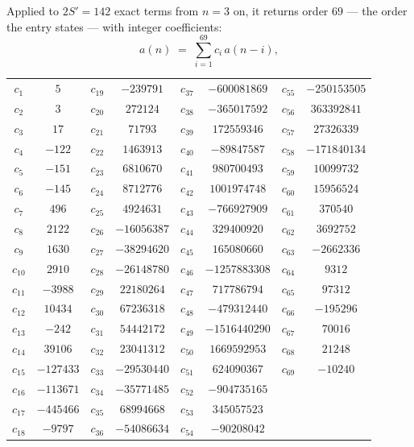 \documentclass[11pt,a4paper]{article}
\theoremstyle{plain}
\theoremstyle{definition}
\begin{document}
Applied to $2S'=142$ exact terms from $n=3$ on, it returns order $69$ --- the
order the entry states --- with integer coefficients:
\[
a(n)\;=\;\sum_{i=1}^{69}c_i\,a(n-i),
\]
\begin{center}\small
\begin{tabular}{cccccccc}
$c_{1}$ & $5$ & $c_{19}$ & $-239791$ & $c_{37}$ & $-600081869$ & $c_{55}$ & $-250153505$ \\
$c_{2}$ & $3$ & $c_{20}$ & $272124$ & $c_{38}$ & $-365017592$ & $c_{56}$ & $363392841$ \\
$c_{3}$ & $17$ & $c_{21}$ & $71793$ & $c_{39}$ & $172559346$ & $c_{57}$ & $27326339$ \\
$c_{4}$ & $-122$ & $c_{22}$ & $1463913$ & $c_{40}$ & $-89847587$ & $c_{58}$ & $-171840134$ \\
$c_{5}$ & $-151$ & $c_{23}$ & $6810670$ & $c_{41}$ & $980700493$ & $c_{59}$ & $10099732$ \\
$c_{6}$ & $-145$ & $c_{24}$ & $8712776$ & $c_{42}$ & $1001974748$ & $c_{60}$ & $15956524$ \\
$c_{7}$ & $496$ & $c_{25}$ & $4924631$ & $c_{43}$ & $-766927909$ & $c_{61}$ & $370540$ \\
$c_{8}$ & $2122$ & $c_{26}$ & $-16056387$ & $c_{44}$ & $329400920$ & $c_{62}$ & $3692752$ \\
$c_{9}$ & $1630$ & $c_{27}$ & $-38294620$ & $c_{45}$ & $165080660$ & $c_{63}$ & $-2662336$ \\
$c_{10}$ & $2910$ & $c_{28}$ & $-26148780$ & $c_{46}$ & $-1257883308$ & $c_{64}$ & $9312$ \\
$c_{11}$ & $-3988$ & $c_{29}$ & $22180264$ & $c_{47}$ & $717786794$ & $c_{65}$ & $97312$ \\
$c_{12}$ & $10434$ & $c_{30}$ & $67236318$ & $c_{48}$ & $-479312440$ & $c_{66}$ & $-195296$ \\
$c_{13}$ & $-242$ & $c_{31}$ & $54442172$ & $c_{49}$ & $-1516440290$ & $c_{67}$ & $70016$ \\
$c_{14}$ & $39106$ & $c_{32}$ & $23041312$ & $c_{50}$ & $1669592953$ & $c_{68}$ & $21248$ \\
$c_{15}$ & $-127433$ & $c_{33}$ & $-29530440$ & $c_{51}$ & $624090367$ & $c_{69}$ & $-10240$ \\
$c_{16}$ & $-113671$ & $c_{34}$ & $-35771485$ & $c_{52}$ & $-904735165$ &  &  \\
$c_{17}$ & $-445466$ & $c_{35}$ & $68994668$ & $c_{53}$ & $345057523$ &  &  \\
$c_{18}$ & $-9797$ & $c_{36}$ & $-54086634$ & $c_{54}$ & $-90208042$ &  &  \\
\end{tabular}
\end{center}
\end{document}
